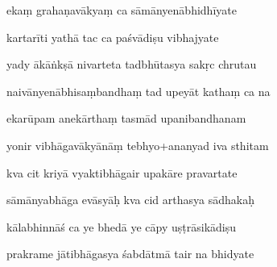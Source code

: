 \documentclass[article,12pt,a4paper]{memoir}%
\newcounter{parCount}
\begin{document}
	  
	  \pstart {} ekaṃ grahaṇavākyaṃ ca sāmānyenābhidhīyate 
	{}
	\pend%
      

	  
	  \pstart \leavevmode%
	kartarīti yathā tac ca paśvādiṣu vibhajyate 
	{}
	\pend%
      

	  
	  \pstart {} yady ākāṅkṣā nivarteta tadbhūtasya sakṛc chrutau 
	{}
	\pend%
      

	  
	  \pstart \leavevmode%
	naivānyenābhisaṃbandhaṃ tad upeyāt kathaṃ ca na 
	{}
	\pend%
      

	  
	  \pstart {} ekarūpam anekārthaṃ tasmād upanibandhanam 
	{}
	\pend%
      

	  
	  \pstart \leavevmode%
	yonir vibhāgavākyānāṃ tebhyo+ananyad iva sthitam 
	{}
	\pend%
      

	  
	  \pstart {} kva cit kriyā vyaktibhāgair upakāre pravartate 
	{}
	\pend%
      

	  
	  \pstart \leavevmode%
	sāmānyabhāga evāsyāḥ kva cid arthasya sādhakaḥ 
	{}
	\pend%
      

	  
	  \pstart {} kālabhinnāś ca ye bhedā ye cāpy uṣṭrāsikādiṣu 
	{}
	\pend%
      

	  
	  \pstart \leavevmode%
	prakrame jātibhāgasya śabdātmā tair na bhidyate 
	{}
	\pend%
      
\end{document}
